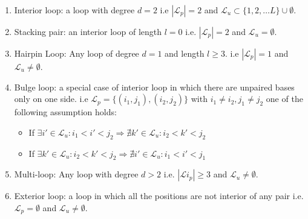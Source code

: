 \begin{enumerate}
	\item Interior loop: a loop with degree $d=2$ i.e $|\mathcal{L}_p|=2$ and $\mathcal{L}_u \subset \{1,2,\dots L\}\cup \emptyset$.
	\item Stacking pair: an interior loop of length $l=0$ i.e. $|\mathcal{L}_p|=2$ and $\mathcal{L}_u = \emptyset$.
	\item Hairpin Loop: Any loop of degree $d=1$ and length $l \geq 3$.  i.e $|\mathcal{L}_p|=1$ and  $\mathcal{L}_u \neq \emptyset$.
	\item Bulge loop: a special case of interior loop in which there are unpaired bases only on one side. i.e  $\mathcal{L}_p=\{(i_1,j_1), (i_2, j_2)\}$ with $i_1 \neq i_2, j_1\neq j_2$ one of the following assumption holds: 
		\begin{itemize}
			\item If $\exists i'\in \mathcal{L}_u \colon i_1<i'<j_2 \Rightarrow \nexists k'\in \mathcal{L}_u \colon i_2<k'<j_2$ 
			\item If $\exists k'\in \mathcal{L}_u \colon i_2<k'<j_2 \Rightarrow \nexists i'\in \mathcal{L}_u \colon i_1<i'<j_1$ 
		\end{itemize}
	\item Multi-loop: Any loop with degree $d>2$ i.e.  $|\mathcal{L}i_p| \geq 3$  and $\mathcal{L}_u \neq \emptyset$.
	\item Exterior loop: a loop in which all the positions are not interior of any pair i.e. $\mathcal{L}_p=\emptyset$ and $\mathcal{L}_u \neq \emptyset$.
\end{enumerate}

